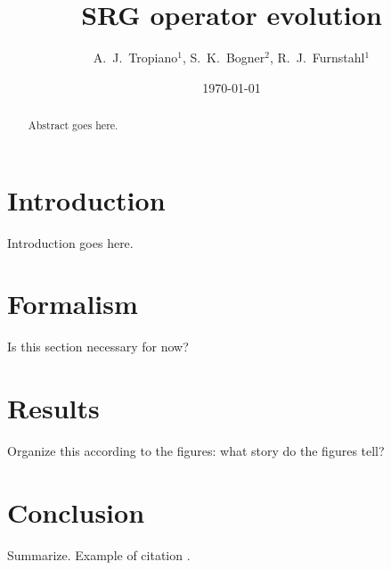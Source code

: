 \documentclass[preprintnumbers,floatfix,aps,prc,preprint,nofootinbib]{revtex4-1}
\begin{document}
\title{SRG operator evolution}


\author{A.~J.~Tropiano$^{1}$, S.~K.~Bogner$^{2}$, R.~J.~Furnstahl$^{1}$}


\date{\today}

\begin{abstract}

Abstract goes here.

\end{abstract}


\maketitle

\newpage


\section{Introduction}
\label{sec:intro}


Introduction goes here.


\section{Formalism}
\label{sec:formalism}


Is this section necessary for now?

\section{Results}
\label{sec:results}


Organize this according to the figures: what story do the figures tell?

	
\section{Conclusion}
\label{sec:conclusion}


Summarize. Example of citation \cite{More:2015tpa}.





\end{document}
